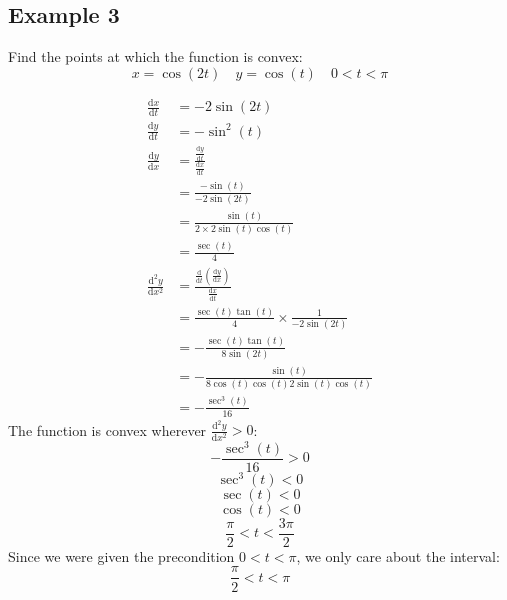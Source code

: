 \documentclass[letterpaper, 12pt]{article}
\newcommand*{\diff}{\mathrm{d}}
\newcommand*{\Diff}[1]{\mathrm{d^#1}}
\begin{document}
\subsection*{Example 3}
Find the points at which the function is convex:
\[ x = \cos(2t) \quad y = \cos(t) \quad 0 < t < \pi \]
\begin{center}
\end{center}
\begin{align*}
  \frac{\diff{x}}{\diff{t}} &= -2\sin(2t) \\
  \frac{\diff{y}}{\diff{t}} &= -\sin^{2}(t) \\
  \frac{\diff{y}}{\diff{x}} &=
    \frac{\frac{\diff{y}}{\diff{t}}}{\frac{\diff{x}}{\diff{t}}} \\
  &= \frac{-\sin(t)}{-2\sin(2t)} \\
  &= \frac{\sin(t)}{2\times2\sin(t)\cos(t)} \\
  &= \frac{\sec(t)}{4} \\
  \frac{\Diff{2}{y}}{\diff{x}^{2}} &=
    \frac{\frac{\diff}{\diff{t}}(\frac{\diff{y}}{\diff{x}})}
      {\frac{\diff{x}}{\diff{t}}} \\
  &= \frac{\sec(t)\tan(t)}{4}\times\frac{1}{-2\sin(2t)} \\
  &= -\frac{\sec(t)\tan(t)}{8\sin(2t)} \\
  &= -\frac{\sin(t)}{8\cos(t)\cos(t)2\sin(t)\cos(t)} \\
  &= -\frac{\sec^{3}(t)}{16}
\end{align*}
The function is convex wherever \( \frac{\Diff{2}{y}}{\diff{x}^{2}} > 0 \):
\[ -\frac{\sec^{3}(t)}{16} > 0 \]
\[ \sec^{3}(t) < 0 \]
\[ \sec(t) < 0 \]
\[ \cos(t) < 0 \]
\[ \frac{\pi}{2} < t < \frac{3\pi}{2} \]
Since we were given the precondition \( 0 < t < \pi \), we only care about the
interval:
\[ \frac{\pi}{2} < t < \pi \]
\end{document}
